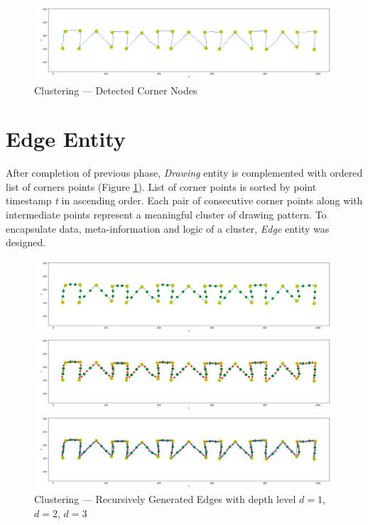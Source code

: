 \begin{figure}[htb]
  \centering
    \includegraphics[width=0.99\textwidth]
        {images/clustering/drawing_clustering_1}
    \caption{Clustering --- Detected Corner Nodes}
    \label{clustering-1}
\end{figure}

\section{Edge Entity}

After completion of previous phase, \textit{Drawing} entity is complemented with ordered list of corners points (Figure \ref{clustering-1}). List of corner points is sorted by point timestamp \textit{t} in ascending order. Each pair of consecutive corner points along with intermediate points represent a meaningful cluster of drawing pattern. To encapsulate data, meta-information and logic of a cluster, \textit{Edge} entity was designed.

\begin{figure}[htb]
  \centering
        
    \includegraphics[width=0.99\textwidth]
        {images/clustering/drawing_clustering_2}
        
    \includegraphics[width=0.99\textwidth]
        {images/clustering/drawing_clustering_3}

    \includegraphics[width=0.99\textwidth]
        {images/clustering/drawing_clustering_4}
        
    \caption{Clustering --- Recursively Generated Edges with depth level $d = 1$, $d = 2$, $d = 3$}
    \label{clustering-depth}
\end{figure}

